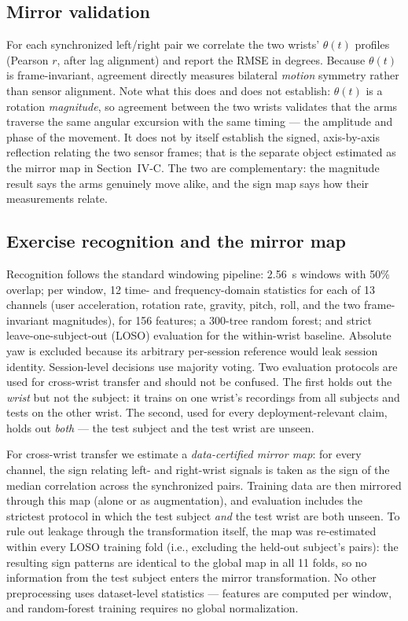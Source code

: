 \documentclass[conference]{IEEEtran}
\begin{document}
\subsection{Mirror validation}
For each synchronized left/right pair we correlate the two wrists'
$\theta(t)$ profiles (Pearson $r$, after lag alignment) and report the
RMSE in degrees. Because $\theta(t)$ is frame-invariant, agreement
directly measures bilateral \emph{motion} symmetry rather than sensor
alignment. Note what this does and does not establish: $\theta(t)$ is
a rotation \emph{magnitude}, so agreement between the two wrists
validates that the arms traverse the same angular excursion with the
same timing --- the amplitude and phase of the movement. It does not
by itself establish the signed, axis-by-axis reflection relating the
two sensor frames; that is the separate object estimated as the mirror
map in Section~IV-C. The two are complementary: the magnitude result
says the arms genuinely move alike, and the sign map says how their
measurements relate.

\subsection{Exercise recognition and the mirror map}
Recognition follows the standard windowing pipeline: 2.56~s windows
with 50\% overlap; per window, 12 time- and frequency-domain
statistics for each of 13 channels (user acceleration, rotation rate,
gravity, pitch, roll, and the two frame-invariant magnitudes), for 156
features; a 300-tree random forest; and strict leave-one-subject-out
(LOSO) evaluation for the within-wrist baseline. Absolute yaw is excluded because its arbitrary
per-session reference would leak session identity. Session-level
decisions use majority voting. Two evaluation protocols are used for
cross-wrist transfer and should not be confused. The first holds out
the \emph{wrist} but not the subject: it trains on one wrist's
recordings from all subjects and tests on the other wrist. The second,
used for every
deployment-relevant claim, holds out \emph{both} --- the test subject
and the test wrist are unseen.

For cross-wrist transfer we estimate a \emph{data-certified mirror
map}: for every channel, the sign relating left- and right-wrist
signals is taken as the sign of the median correlation across the
synchronized pairs. Training data are then mirrored through this map
(alone or as augmentation), and evaluation includes the strictest
protocol in which the test subject \emph{and} the test wrist are both
unseen. To rule out leakage through the transformation itself, the
map was re-estimated within every LOSO training fold (i.e., excluding
the held-out subject's pairs): the resulting sign patterns are
identical to the global map in all 11 folds, so no information from
the test subject enters the mirror transformation. No other
preprocessing uses dataset-level statistics --- features are computed
per window, and random-forest training requires no global
normalization.
\end{document}
